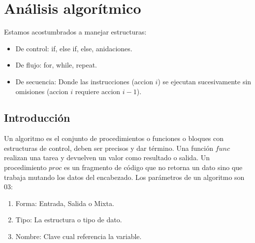 \chapter{Análisis algorítmico}

Estamos acostumbrados a manejar estructuras:
\begin{itemize}
	\item De control: if, else if, else, anidaciones.
	\item De flujo: for, while, repeat.
	\item De secuencia: Donde las instrucciones (accion $i$) se ejecutan sucesivamente sin omisiones (accion $i$ requiere accion $i-1$).
\end{itemize}

\section{Introducción}
Un algoritmo es el conjunto de procedimientos o funciones o bloques con estructuras de control, deben ser precisos y dar término.
Una función $func$ realizan una tarea y devuelven un valor como resultado o salida.
Un procedimiento $proc$ es un fragmento de código que no retorna un dato sino que trabaja mutando los datos del encabezado.
Los parámetros de un algoritmo son 03:
\begin{enumerate}
	\item Forma: Entrada, Salida o Mixta.
	\item Tipo: La estructura o tipo de dato.
	\item Nombre: Clave cual referencia la variable.
\end{enumerate}

